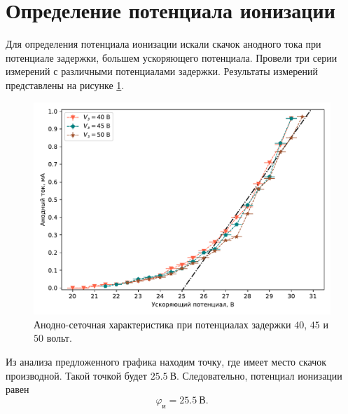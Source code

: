 \documentclass[12pt]{article}
\begin{document}
	\section{Определение потенциала ионизации}
	Для определения потенциала ионизации искали скачок анодного тока при потенциале задержки, большем ускоряющего потенциала. Провели три серии измерений с различными потенциалами задержки. Результаты измерений представлены на рисунке \ref{fig:figure2}.
	\begin{figure}[htbp]
		\centering
		\includegraphics[width=\linewidth]{../plots/2}
		\caption{Анодно-сеточная характеристика при потенциалах задержки $40$, $45$ и $50$ вольт.}
		\label{fig:figure2}
	\end{figure}
	Из анализа предложенного графика находим точку, где имеет место скачок производной. Такой точкой будет $25.5\ \text{В}$. Следовательно, потенциал ионизации равен 
	\begin{equation}
		\varphi_\text{и} = 25.5\ \text{В}.
	\end{equation}
\end{document}

